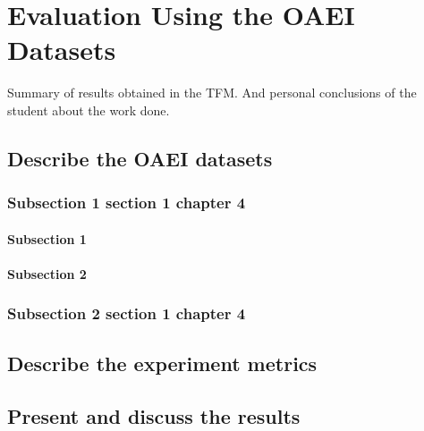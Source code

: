 \chapter{Evaluation Using the OAEI Datasets}

Summary of results obtained in the TFM. And personal conclusions of the student about the work done.


\section{Describe the OAEI datasets}

\subsection{Subsection 1 section 1 chapter 4}

\subsubsection{Subsection 1}

\subsubsection{Subsection 2}

\subsection{Subsection 2 section 1 chapter 4}

\section{Describe the experiment metrics}
\section{Present and discuss the results}